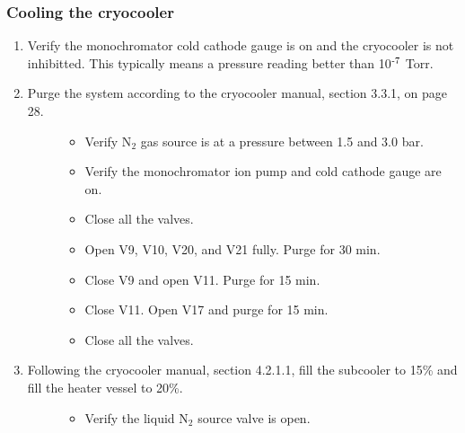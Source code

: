 \documentclass[letterpaper,10pt,english]{sphinxmanual}
\begin{document}
\subsubsection{Cooling the cryocooler}
\label{\detokenize{staff:cooling-the-cryocooler}}\begin{enumerate}
%
\item {} 
\sphinxAtStartPar
Verify the monochromator cold cathode gauge is on and the cryocooler is not inhibitted. This typically means a pressure reading better than 10$^{\text{\sphinxhyphen{}7}}$ Torr.

\item {} \begin{description}
\item[{Purge the system according to the cryocooler manual, section 3.3.1, on page 28. }] \leavevmode\begin{itemize}
\item {} 
\sphinxAtStartPar
Verify N$_{\text{2}}$ gas source is at a pressure between 1.5 and 3.0 bar.

\item {} 
\sphinxAtStartPar
Verify the monochromator ion pump and cold cathode gauge are on.

\item {} 
\sphinxAtStartPar
Close all the valves.

\item {} 
\sphinxAtStartPar
Open V9, V10, V20, and V21 fully. Purge for 30 min.

\item {} 
\sphinxAtStartPar
Close V9 and open V11. Purge for 15 min.

\item {} 
\sphinxAtStartPar
Close V11. Open V17 and purge for 15 min.

\item {} 
\sphinxAtStartPar
Close all the valves.

\end{itemize}

\end{description}

\item {} \begin{description}
\item[{Following the cryocooler manual, section 4.2.1.1, fill the sub\sphinxhyphen{}cooler to 15\% and fill the heater vessel to 20\%.}] \leavevmode\begin{itemize}
\item {} 
\sphinxAtStartPar
Verify the liquid N$_{\text{2}}$ source valve is open.


\end{itemize}
\end{description}
\end{enumerate}
\end{document}
